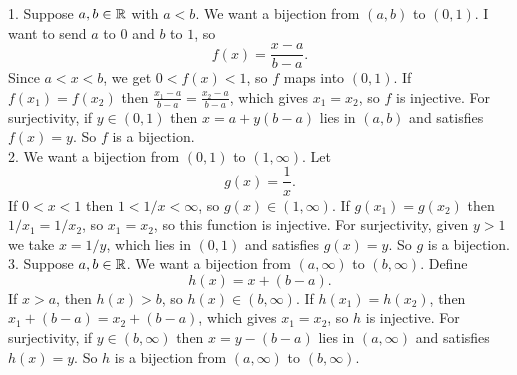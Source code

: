 \documentclass{report}
\begin{document}
\begin{proofWithHibiscus}
  1. Suppose $a,b \in \mathbb{R}$ with $a<b$. We want a bijection from $(a,b)$ to $(0,1)$. 
  I want to send $a$ to $0$ and $b$ to $1$, so 
  \[
    f(x) = \frac{x-a}{b-a}.
  \]
  Since $a<x<b$, we get $0<f(x)<1$, so $f$ maps into $(0,1)$. 
  If $f(x_1)=f(x_2)$ then $\frac{x_1-a}{b-a}=\frac{x_2-a}{b-a}$, which gives $x_1=x_2$, so $f$ is injective. 
  For surjectivity, if $y\in(0,1)$ then $x=a+y(b-a)$ lies in $(a,b)$ and satisfies $f(x)=y$. 
  So $f$ is a bijection. \\

  2. We want a bijection from $(0,1)$ to $(1,\infty)$. 
  Let 
  \[
    g(x) = \frac{1}{x}.
  \]
  If $0<x<1$ then $1<1/x<\infty$, so $g(x)\in(1,\infty)$. 
  If $g(x_1)=g(x_2)$ then $1/x_1=1/x_2$, so $x_1=x_2$, so this function is injective. 
  For surjectivity, given $y>1$ we take $x=1/y$, which lies in $(0,1)$ and satisfies $g(x)=y$. 
  So $g$ is a bijection. \\

  3. Suppose $a,b \in \mathbb{R}$. We want a bijection from $(a,\infty)$ to $(b,\infty)$. 
  Define 
  \[
    h(x) = x+(b-a).
  \]
  If $x>a$, then $h(x) > b$, so $h(x) \in (b,\infty)$. 
  If $h(x_1)=h(x_2)$, then $x_1+(b-a)=x_2+(b-a)$, which gives $x_1=x_2$, so $h$ is injective. 
  For surjectivity, if $y \in (b,\infty)$ then $x=y-(b-a)$ lies in $(a,\infty)$ and satisfies $h(x)=y$. 
  So $h$ is a bijection from $(a,\infty)$ to $(b,\infty)$. 
  
\end{proofWithHibiscus}
\end{document}
